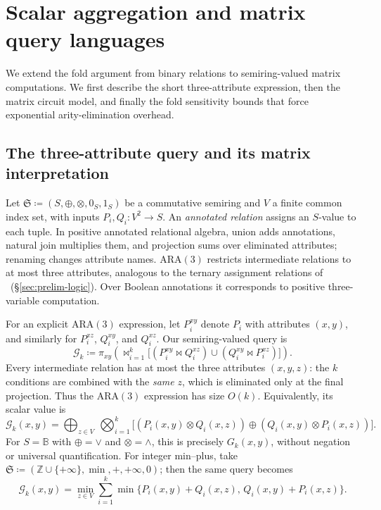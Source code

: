 \section{Scalar aggregation and matrix query languages}\label{sec:matrix}
We extend the fold argument from binary relations to semiring-valued
matrix computations. We first describe the short three-attribute
expression, then the matrix circuit model, and finally the fold
sensitivity bounds that force exponential arity-elimination overhead.

\subsection{The three-attribute query and its matrix interpretation}\label{sec:weightedG}
Let $\mathfrak S\coloneqq(S,\oplus,\otimes,0_S,1_S)$ be a commutative
semiring and $V$ a finite common index set, with inputs
$P_i,Q_i:V^2\to S$. An \emph{annotated relation} assigns an
$S$-value to each tuple. In positive annotated relational algebra,
union adds annotations, natural join multiplies them, and projection
sums over eliminated attributes; renaming changes attribute names.
ARA$(3)$ restricts intermediate relations to at most three attributes,
analogous to the ternary assignment relations of \FOthree\
(\S\ref{sec:prelim-logic}). Over Boolean annotations it corresponds
to positive three-variable computation.

For an explicit ARA$(3)$ expression, let $P_i^{xy}$ denote $P_i$
with attributes $(x,y)$, and similarly for $P_i^{xz}$, $Q_i^{xy}$,
and $Q_i^{xz}$. Our semiring-valued query is
\[
 \mathcal G_k\coloneqq\pi_{xy}\!\left(
 \mathop{\bowtie}_{i=1}^{k}
 \bigl[(P_i^{xy}\bowtie Q_i^{xz})
       \cup(Q_i^{xy}\bowtie P_i^{xz})\bigr]\right).
\]
Every intermediate relation has at most the three attributes
$(x,y,z)$: the $k$ conditions are combined with the \emph{same} $z$, which is
eliminated only at the final projection. Thus the ARA$(3)$ expression
has size $O(k)$. Equivalently, its scalar value is
\[
 \mathcal G_k(x,y)=\bigoplus_{z\in V}\ \bigotimes_{i=1}^{k}
 \bigl[(P_i(x,y)\otimes Q_i(x,z))
        \oplus(Q_i(x,y)\otimes P_i(x,z))\bigr].
\]
For $S=\mathbb B$ with $\oplus=\lor$ and $\otimes=\land$, this
is precisely $G_k(x,y)$, without negation or universal quantification. For integer min--plus, take
$\mathfrak S\coloneqq(\mathbb Z\cup\{+\infty\},\min,+,+\infty,0)$;
then the same query becomes
\[
 \mathcal G_k(x,y)=\min_{z\in V}\sum_{i=1}^{k}
 \min\{P_i(x,y)+Q_i(x,z),\,Q_i(x,y)+P_i(x,z)\}.
\]

